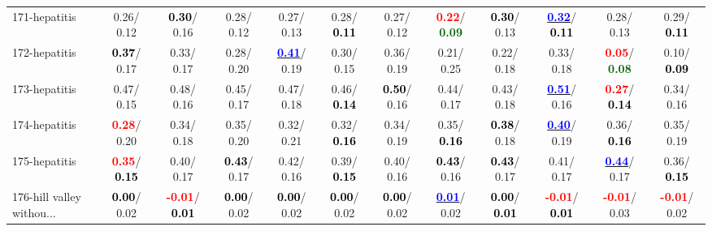 \begin{table}[h]
\begin{center}
{\begin{tabular}{lc|c|c|c|c|c|c|c|c|c|c}
171-hepatitis &   0.26/  0.12 & \textcolor{black}{\textbf{  0.30}}/  0.16 &   0.28/  0.12 &   0.27/  0.13 &   0.28/\textcolor{black}{\textbf{  0.11}} &   0.27/  0.12 & \textcolor{red}{\textbf{  0.22}}/\textcolor{darkgreen}{\textbf{  0.09}} & \textcolor{black}{\textbf{  0.30}}/  0.13 & \underline{\textcolor{blue}{\textbf{  0.32}}}/\textcolor{black}{\textbf{  0.11}} &   0.28/  0.13 &   0.29/\textcolor{black}{\textbf{  0.11}} \\
172-hepatitis & \textcolor{black}{\textbf{  0.37}}/  0.17 &   0.33/  0.17 &   0.28/  0.20 & \underline{\textcolor{blue}{\textbf{  0.41}}}/  0.19 &   0.30/  0.15 &   0.36/  0.19 &   0.21/  0.25 &   0.22/  0.18 &   0.33/  0.18 & \textcolor{red}{\textbf{  0.05}}/\textcolor{darkgreen}{\textbf{  0.08}} &   0.10/\textcolor{black}{\textbf{  0.09}} \\
173-hepatitis &   0.47/  0.15 &   0.48/  0.16 &   0.45/  0.17 &   0.47/  0.18 &   0.46/\textcolor{black}{\textbf{  0.14}} & \textcolor{black}{\textbf{  0.50}}/  0.16 &   0.44/  0.17 &   0.43/  0.18 & \underline{\textcolor{blue}{\textbf{  0.51}}}/  0.16 & \textcolor{red}{\textbf{  0.27}}/\textcolor{black}{\textbf{  0.14}} &   0.34/  0.16 \\
174-hepatitis & \textcolor{red}{\textbf{  0.28}}/  0.20 &   0.34/  0.18 &   0.35/  0.20 &   0.32/  0.21 &   0.32/\textcolor{black}{\textbf{  0.16}} &   0.34/  0.19 &   0.35/\textcolor{black}{\textbf{  0.16}} & \textcolor{black}{\textbf{  0.38}}/  0.18 & \underline{\textcolor{blue}{\textbf{  0.40}}}/  0.19 &   0.36/\textcolor{black}{\textbf{  0.16}} &   0.35/  0.19 \\ \hline
175-hepatitis & \textcolor{red}{\textbf{  0.35}}/\textcolor{black}{\textbf{  0.15}} &   0.40/  0.17 & \textcolor{black}{\textbf{  0.43}}/  0.17 &   0.42/  0.16 &   0.39/\textcolor{black}{\textbf{  0.15}} &   0.40/  0.16 & \textcolor{black}{\textbf{  0.43}}/  0.16 & \textcolor{black}{\textbf{  0.43}}/  0.17 &   0.41/  0.17 & \underline{\textcolor{blue}{\textbf{  0.44}}}/  0.17 &   0.36/\textcolor{black}{\textbf{  0.15}} \\
176-hill valley withou... & \textcolor{black}{\textbf{  0.00}}/  0.02 & \textcolor{red}{\textbf{ -0.01}}/\textcolor{black}{\textbf{  0.01}} & \textcolor{black}{\textbf{  0.00}}/  0.02 & \textcolor{black}{\textbf{  0.00}}/  0.02 & \textcolor{black}{\textbf{  0.00}}/  0.02 & \textcolor{black}{\textbf{  0.00}}/  0.02 & \underline{\textcolor{blue}{\textbf{  0.01}}}/  0.02 & \textcolor{black}{\textbf{  0.00}}/\textcolor{black}{\textbf{  0.01}} & \textcolor{red}{\textbf{ -0.01}}/\textcolor{black}{\textbf{  0.01}} & \textcolor{red}{\textbf{ -0.01}}/  0.03 & \textcolor{red}{\textbf{ -0.01}}/  0.02 \\

\end{tabular}}
\end{center}
\end{table}
